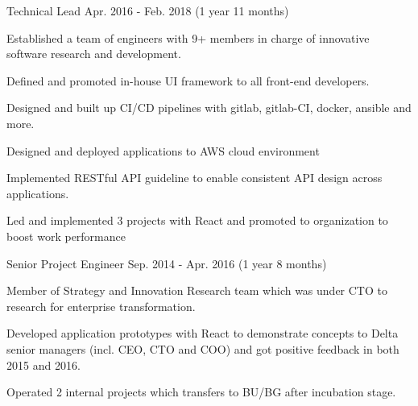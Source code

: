 \begin{cventries}
  \cventry
    {Technical Lead} %
    {} %
    {} %
    {Apr. 2016 - Feb. 2018 (1 year 11 months)} %
    {
      \begin{cvitems} %
        \item {Established a team of engineers with 9+ members in charge of innovative software research and development.}
        \item {Defined and promoted in-house UI framework to all front-end developers.}
        \item {Designed and built up CI/CD pipelines with gitlab, gitlab-CI, docker, ansible and more.}
        \item {Designed and deployed applications to AWS cloud environment}
        \item {Implemented RESTful API guideline to enable consistent API design across applications.}
        \item {Led and implemented 3 projects with React and promoted to organization to boost work performance}
      \end{cvitems}
    }

  \cventry
    {Senior Project Engineer} %
    {} %
    {} %
    {Sep. 2014 - Apr. 2016 (1 year 8 months)} %
    {
      \begin{cvitems} %
        \item {Member of Strategy and Innovation Research team which was under CTO to research for enterprise transformation.}
        \item {Developed application prototypes with React to demonstrate concepts to Delta senior managers (incl. CEO, CTO and COO) and got positive feedback in both 2015 and 2016.}
        \item {Operated 2 internal projects which transfers to BU/BG after incubation stage. }
      \end{cvitems}
    }



\end{cventries}
